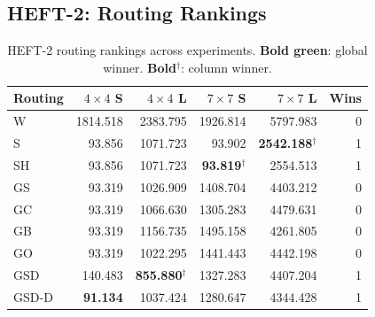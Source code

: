 \documentclass[11pt]{article}
\newcommand{\win}[1]{\textcolor{green!50!black}{\textbf{#1}}}
\newcommand{\bad}[1]{\textcolor{red!70!black}{#1}}
\begin{document}
\subsection{HEFT-2: Routing Rankings}
\begin{table}[H]
\centering
\small
\setlength{\tabcolsep}{4pt}
\begin{tabular}{l  r r r r r}
\toprule
\textbf{Routing} & $4\times4$ S & $4\times4$ L & $7\times7$ S & $7\times7$ L & \textbf{Wins} \\
\midrule
W & \bad{1814.518} & \bad{2383.795} & \bad{1926.814} & \bad{5797.983} & 0 \\
S & 93.856 & 1071.723 & 93.902 & \textbf{2542.188}$^\dagger$ & 1 \\
SH & 93.856 & 1071.723 & \textbf{93.819}$^\dagger$ & 2554.513 & 1 \\
GS & 93.319 & 1026.909 & 1408.704 & 4403.212 & 0 \\
GC & 93.319 & 1066.630 & 1305.283 & 4479.631 & 0 \\
GB & 93.319 & 1156.735 & 1495.158 & 4261.805 & 0 \\
GO & 93.319 & 1022.295 & 1441.443 & 4442.198 & 0 \\
GSD & 140.483 & \textbf{855.880}$^\dagger$ & 1327.283 & 4407.204 & 1 \\
GSD\mbox{-}D & \win{91.134} & 1037.424 & 1280.647 & 4344.428 & 1 \\
\bottomrule
\end{tabular}
\caption{HEFT-2 routing rankings across experiments. \win{Bold green}: global winner. \textbf{Bold}$^\dagger$: column winner.}
\end{table}
\end{document}
